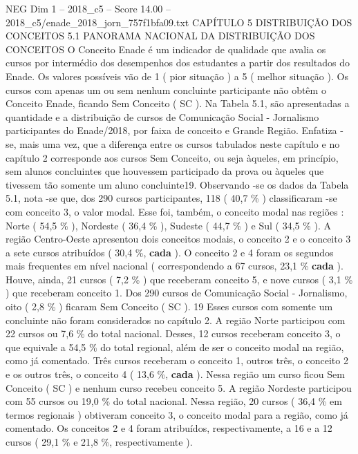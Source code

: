 \begin{textsample}{NEG Dim 1 – 2018\_c5 – Score 14.00 – 2018\_c5/enade\_2018\_jorn\_757f1bfa09.txt}  \label{ex:f1_neg_377}
CAPÍTULO 5 DISTRIBUIÇÃO DOS CONCEITOS 5.1 PANORAMA NACIONAL DA DISTRIBUIÇÃO DOS CONCEITOS O Conceito Enade é um indicador de qualidade que avalia os cursos por intermédio dos desempenhos dos estudantes a partir dos resultados do Enade.
Os valores possíveis vão de 1 ( pior situação ) a 5 ( melhor situação ).
Os cursos com apenas um ou sem nenhum concluinte participante não obtêm o Conceito Enade, ficando Sem Conceito ( SC ).
Na Tabela 5.1, são apresentadas a quantidade e a distribuição de cursos de Comunicação Social - Jornalismo participantes do Enade/2018, por faixa de conceito e Grande Região.
Enfatiza -se, mais uma vez, que a diferença entre os cursos tabulados neste capítulo e no capítulo 2 corresponde aos cursos Sem Conceito, ou seja àqueles, em princípio, sem alunos concluintes que houvessem participado da prova ou àqueles que tivessem tão somente um aluno concluinte19.
Observando -se os dados da Tabela 5.1, nota -se que, dos 290 cursos participantes, 118 ( 40,7 \% ) classificaram -se com conceito 3, o valor modal.
Esse foi, também, o conceito modal nas regiões : Norte ( 54,5 \% ), Nordeste ( 36,4 \% ), Sudeste ( 44,7 \% ) e Sul ( 34,5 \% ).
A região Centro-Oeste apresentou dois conceitos modais, o conceito 2 e o conceito 3 a sete cursos atribuídos ( 30,4 \%, \textbf{cada} ).
O conceito 2 e 4 foram os segundos mais frequentes em nível nacional ( correspondendo a 67 cursos, 23,1 \% \textbf{cada} ).
Houve, ainda, 21 cursos ( 7,2 \% ) que receberam conceito 5, e nove cursos ( 3,1 \% ) que receberam conceito 1.
Dos 290 cursos de Comunicação Social - Jornalismo, oito ( 2,8 \% ) ficaram Sem Conceito ( SC ). 19 Esses cursos com somente um concluinte não foram considerados no capítulo 2.
A região Norte participou com 22 cursos ou 7,6 \% do total nacional.
Desses, 12 cursos receberam conceito 3, o que equivale a 54,5 \% do total regional, além de ser o conceito modal na região, como já comentado.
Três cursos receberam o conceito 1, outros três, o conceito 2 e os outros três, o conceito 4 ( 13,6 \%, \textbf{cada} ).
Nessa região um curso ficou Sem Conceito ( SC ) e nenhum curso recebeu conceito 5.
A região Nordeste participou com 55 cursos ou 19,0 \% do total nacional.
Nessa região, 20 cursos ( 36,4 \% em termos regionais ) obtiveram conceito 3, o conceito modal para a região, como já comentado.
Os conceitos 2 e 4 foram atribuídos, respectivamente, a 16 e a 12 cursos ( 29,1 \% e 21,8 \%, respectivamente ).

\end{textsample}
